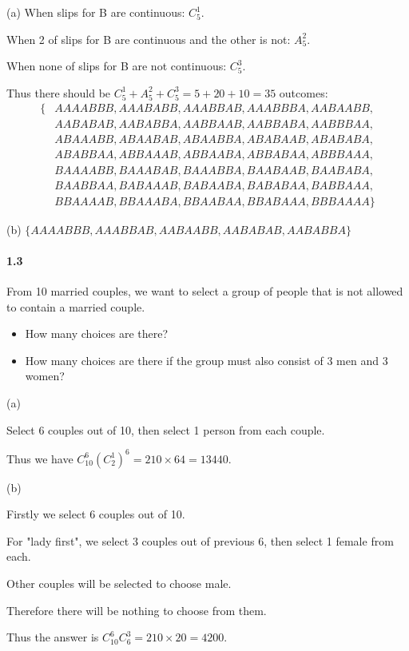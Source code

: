 \begin{solution}

(a) When slips for B are continuous: $C_{5}^{1}$.

When 2 of slips for B are continuous and the other is not: $A_{5}^{2}$.

When none of slips for B are not continuous: $C_{5}^{3}$.

Thus there should be $C_{5}^{1}+A_{5}^{2}+C_{5}^{3} = 5+20+10 = 35$ outcomes:
\begin{equation*}
    \begin{split}
      \{& AAAABBB, AAABABB, AAABBAB, AAABBBA, AABAABB,\\
        & AABABAB, AABABBA, AABBAAB, AABBABA, AABBBAA,\\
        & ABAAABB, ABAABAB, ABAABBA, ABABAAB, ABABABA,\\
        & ABABBAA, ABBAAAB, ABBAABA, ABBABAA, ABBBAAA,\\
        & BAAAABB, BAAABAB, BAAABBA, BAABAAB, BAABABA,\\
        & BAABBAA, BABAAAB, BABAABA, BABABAA, BABBAAA,\\
        & BBAAAAB, BBAAABA, BBAABAA, BBABAAA, BBBAAAA\}
    \end{split}
\end{equation*}

(b)
$\{AAAABBB, AAABBAB, AABAABB, AABABAB, AABABBA\}$

\end{solution}

\paragraph{1.3}
From 10 married couples, we want to select a group of people that is not allowed to contain a married couple.
\begin{itemize}
    \item[(a)] How many choices are there?
    \item[(b)] How many choices are there if the group must also consist of 3 men and 3 women?
\end{itemize}

\begin{solution}

(a)

Select 6 couples out of 10, then select 1 person from each couple.

Thus we have $C_{10}^6 {(C_{2}^1)}^6 = 210 \times 64 = 13440$.

(b)

Firstly we select 6 couples out of 10.

For "lady first", we select 3 couples out of previous 6, then select 1 female from each.

Other couples will be selected to choose male.

Therefore there will be nothing to choose from them.

Thus the answer is $C_{10}^6 C_{6}^3 = 210 \times 20 = 4200$.

\end{solution}

